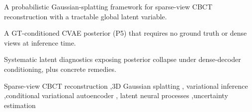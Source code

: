 \begin{highlights}
\item A probabilistic Gaussian-splatting framework for sparse-view CBCT
reconstruction with a tractable global latent variable.
\item A GT-conditioned CVAE posterior (P5) that requires no ground truth
or dense views at inference time.
\item Systematic latent diagnostics exposing posterior collapse under
dense-decoder conditioning, plus concrete remedies.
\end{highlights}

\begin{keyword}
Sparse-view CBCT reconstruction \sep 3D Gaussian splatting \sep
variational inference \sep conditional variational autoencoder \sep
latent neural processes \sep uncertainty estimation
\end{keyword}
